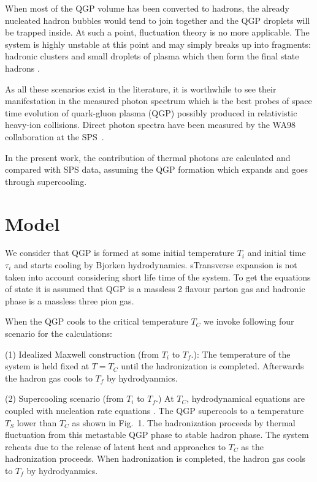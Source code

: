\documentclass[aps,prc,preprint,superscriptaddress,showpacs,showkeys]{revtex4-1}
\begin{document}
  When most of the QGP volume has been converted to hadrons, 
the already nucleated hadron bubbles would tend to join together and 
the QGP droplets will be trapped inside. At such a point, fluctuation 
theory is no more applicable. The system is highly unstable at this point 
and may simply breaks up into fragments: hadronic clusters and small 
droplets of plasma which then form the final state hadrons \cite{ZABPRC}. 

  As all these scenarios exist in the literature, it is worthwhile 
to see their manifestation in the measured photon spectrum 
which is the best probes of space time evolution of 
quark-gluon plasma (QGP) possibly produced in relativistic heavy-ion
collisions. Direct photon spectra have been measured by
the WA98 collaboration at the SPS~\cite{WA98}.

   In the present work, the contribution of thermal photons  
are calculated and compared with SPS data, assuming the QGP formation which 
expands and goes through supercooling.


\section{Model}

 We consider that QGP is formed at some initial temperature $T_i$ and
initial time $\tau_i$ and starts cooling by Bjorken hydrodynamics.
sTransverse expansion is not taken into account considering short 
life time of the system. To get the equations of state it is assumed that 
QGP is a massless 2 flavour parton gas and hadronic phase is a massless three 
pion gas.

 When the QGP cools to the critical temperature $T_C$ we invoke 
following four scenario for the calculations:

(1) Idealized Maxwell construction (from $T_i$ to $T_f$.):
    The temperature of the system is held fixed at $T=T_C$ until 
    the hadronization is completed. Afterwards the hadron gas
    cools to $T_f$ by hydrodyanmics.

(2) Supercooling scenario (from $T_i$ to $T_f$.)
   At $T_C$, hydrodynamical equations are coupled with nucleation 
  rate equations \cite{IHOMO,SPINO}. The QGP 
   supercools to a temperature $T_S$ lower than 
  $T_C$ as shown in Fig.~1. The hadronization proceeds by 
  thermal fluctuation from this metastable QGP phase to stable hadron phase. 
 The system reheats due to the release of latent heat and approaches to 
 $T_C$ as the hadronization proceeds. When hadronization is completed,  
 the hadron gas cools to $T_f$ by hydrodyanmics.
\end{document}
